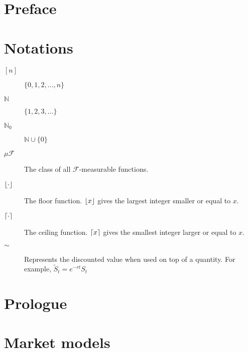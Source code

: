 \documentclass[12pt,a4paper,oneside]{amsbook}
\begin{document}
\frontmatter







\tableofcontents



\chapter*{Preface}
\label{cha:preface}



\chapter*{Notations}
\begin{description}
	\item[$ {[n]} $] $ \{0, 1, 2, \dots, n\} $
	\item[$ \mathbb{N} $] $ \{ 1, 2, 3, \dots \} $
	\item[$ \mathbb{N}_0 $] $ \mathbb{N} \cup \{ 0 \} $
	\item[$ \mu \mathcal{F} $] The class of all $ \mathcal{F} $-measurable functions.
	\item[$ \left\lfloor\cdot\right\rfloor $] The floor function. $ \left\lfloor x\right\rfloor $ gives the largest integer smaller or equal to $ x $.
	\item[$ \left\lceil\cdot\right\rceil $] The ceiling function. $ \left\lceil x\right\rceil $ gives the smallest integer larger or equal to $ x $.
	\item[$ \sim $] Represents the discounted value when used on top of a quantity. For example, $ \tilde{S}_t = e^{-rt} S_t $
\end{description}


\mainmatter

\chapter{Prologue}
\label{cha:prologue}


\chapter{Market models}
\label{cha:models}

\end{document}
